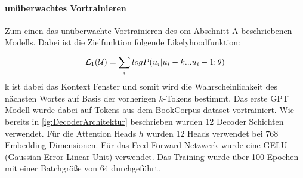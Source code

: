\documentclass[conference]{IEEEtran}
\begin{document}
\paragraph{unüberwachtes Vortrainieren}
Zum einen das unüberwachte Vortrainieren des om Abschnitt A beschriebenen Modells. Dabei ist die Zielfunktion folgende Likelyhoodfunktion:
\begin{equation}
    {\cal L}_1({\cal U}) = \sum_{i}^{} log P( u_i|u_i-k ... u_i-1;\theta)
    \label{eq:Zielfunktion1}
\end{equation}
k ist dabei das Kontext Fenster und somit wird die Wahrscheinlichkeit des nächsten Wortes auf Basis der vorherigen $k$-Tokens bestimmt. Das erste GPT Modell wurde dabei auf Tokens aus dem BookCorpus dataset vortrainiert. Wie bereits in \autoref{ig:DecoderArchitektur} beschrieben wurden 12 Decoder Schichten verwendet. Für die Attention Heads $h$ wurden 12 Heads verwendet bei 768 Embedding Dimensionen. Für das Feed Forward Netzwerk wurde eine GELU (Gaussian Error Linear Unit) verwendet. Das Training wurde über 100 Epochen mit einer Batchgröße von 64 durchgeführt.
\end{document}
